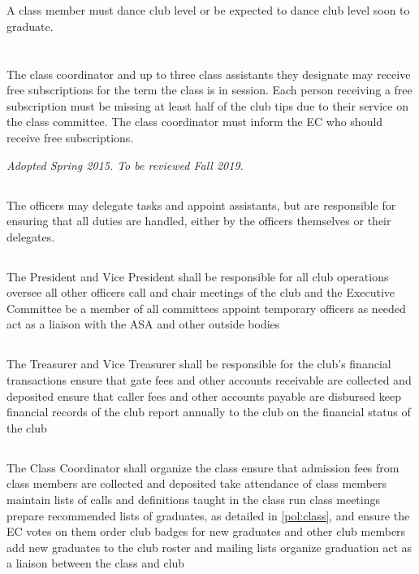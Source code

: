\documentclass{bylaws}
\newcommand{\sptimes}[2]{\emph{Adopted #1. To be reviewed #2.}}
\begin{document}
\section{}A class member must dance club level or be expected to dance club level soon to graduate.
\section{}The class coordinator and up to three class assistants they designate may receive free subscriptions for the term the class is in session. Each person receiving a free subscription must be missing at least half of the club tips due to their service on the class committee. The class coordinator must inform the EC who should receive free subscriptions.


\sptimes{Spring 2015}{Fall 2019}


\subsection{}The officers may delegate tasks and appoint assistants, but are responsible for ensuring that all duties are handled, either by the officers themselves or their delegates.

\subsection{}The President and Vice President shall
\duty be responsible for all club operations
\duty oversee all other officers
\duty call and chair meetings of the club and the Executive Committee
\duty be a member of all committees
\duty appoint temporary officers as needed
\duty act as a liaison with the ASA and other outside bodies

\subsection{}The Treasurer and Vice Treasurer shall
\duty be responsible for the club's financial transactions
\duty ensure that gate fees and other accounts receivable are collected and deposited
\duty ensure that caller fees and other accounts payable are disbursed
\duty keep financial records of the club
\duty report annually to the club on the financial status of the club

\subsection{}The Class Coordinator shall
\duty organize the class
\duty ensure that admission fees from class members are collected and deposited
\duty take attendance of class members
\duty maintain lists of calls and definitions taught in the class
\duty run class meetings
\duty prepare recommended lists of graduates, as detailed in \ref{pol:class}, and ensure the EC votes on them
\duty order club badges for new graduates and other club members
\duty add new graduates to the club roster and mailing lists
\duty organize graduation
\duty act as a liaison between the class and club
\end{document}
